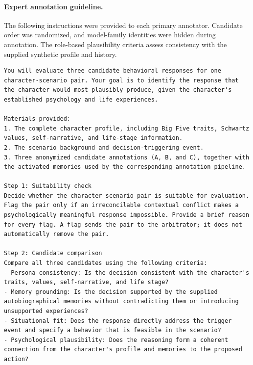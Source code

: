 \documentclass[11pt]{article}
\begin{document}
\paragraph{Expert annotation guideline.}
\label{app:expert_guideline}
The following instructions were provided to each primary annotator. Candidate order was randomized, and model-family identities were hidden during annotation. The role-based plausibility criteria assess consistency with the supplied synthetic profile and history.

\begin{tcolorbox}[
  breakable,
  colback=blue!5,
  colframe=blue!60!black,
  title={\textbf{Expert Annotation Guideline}},
  fonttitle=\bfseries,
  rounded corners,
  boxrule=1.0pt
]
\begin{Verbatim}[fontsize=\scriptsize, breaklines=true, breaksymbolleft={}, breaksymbolright={}, breakindent=1em]
You will evaluate three candidate behavioral responses for one character-scenario pair. Your goal is to identify the response that the character would most plausibly produce, given the character's established psychology and life experiences.

Materials provided:
1. The complete character profile, including Big Five traits, Schwartz values, self-narrative, and life-stage information.
2. The scenario background and decision-triggering event.
3. Three anonymized candidate annotations (A, B, and C), together with the activated memories used by the corresponding annotation pipeline.

Step 1: Suitability check
Decide whether the character-scenario pair is suitable for evaluation. Flag the pair only if an irreconcilable contextual conflict makes a psychologically meaningful response impossible. Provide a brief reason for every flag. A flag sends the pair to the arbitrator; it does not automatically remove the pair.

Step 2: Candidate comparison
Compare all three candidates using the following criteria:
- Persona consistency: Is the decision consistent with the character's traits, values, self-narrative, and life stage?
- Memory grounding: Is the decision supported by the supplied autobiographical memories without contradicting them or introducing unsupported experiences?
- Situational fit: Does the response directly address the trigger event and specify a behavior that is feasible in the scenario?
- Psychological plausibility: Does the reasoning form a coherent connection from the character's profile and memories to the proposed action?


\end{Verbatim}
\end{tcolorbox}
\end{document}
